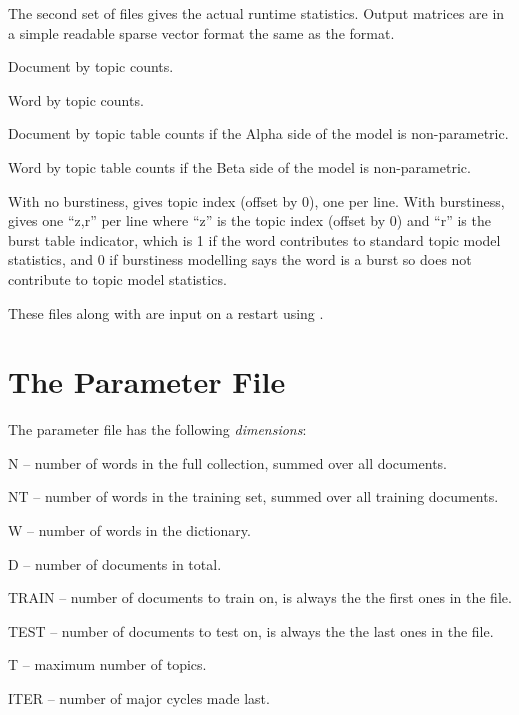 \documentclass[a4paper,english]{article}
\begin{document}
The second set of files gives the actual runtime statistics.
Output matrices are in a simple readable sparse vector format
the same as the  format.
\begin{Description}\setlength{\itemsep}{0cm}
\item[\File{RepStem.ndt}] Document by topic counts.
\item[\File{RepStem.nwt}] Word by topic counts.
\item[\File{RepStem.tdt}] Document by topic table counts if
the Alpha side of the model is non-parametric.
\item[\File{RepStem.twt}] Word by topic table counts if
the Beta side of the model is non-parametric.
\item[\File{RepStem.zt}] With no burstiness, gives topic
index (offset by 0), one per line.  
With burstiness, gives one ``z,r'' per line where ``z'' is the
topic index (offset by 0) and ``r'' is the burst table indicator, 
which is 1 if the word
contributes to standard topic model statistics, and
0 if burstiness modelling says the word is a burst
so does not contribute to topic model  statistics.
\end{Description}
These files along with  are input
on a restart using .

\section{The Parameter File}

The parameter file has the following \emph{dimensions}:
\begin{Description}[T]
\item{N} -- number of words in the full collection,
          summed over all documents.
\item{NT} -- number of words in the training set,
          summed over all training documents.
\item{W} -- number of words in the dictionary.
\item{D} -- number of documents in total.
\item{TRAIN} -- number of documents to train on, is always the
the first ones in the file.
\item{TEST} -- number of documents to test on, is always the
the last ones in the file.
\item{T} -- maximum number of topics.
\item{ITER} -- number of major cycles made last.
\end{Description}
\end{document}
